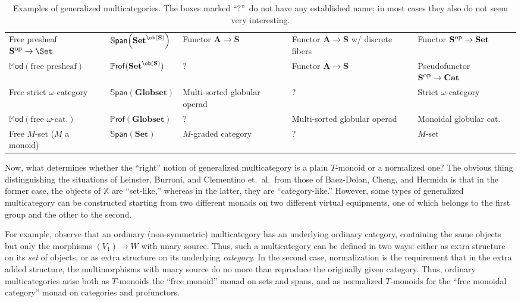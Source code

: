 \documentclass{tac}
\makeatletter
\newcommand{\mb}[1]{{\mathbf{#1}}}
\newcommand{\SPAN}[1]{\mathbb{S}\mathsf{pan}\!\left(\mb{#1}\right)}
\newcommand{\iPROF}[1]{\mathbb{P}\mathsf{rof}(\mb{#1})}
\newcommand{\MOD}{\mathbb{M}\mathsf{od}}
\newcommand{\op}{\mbox{\scriptsize op}}
\numberwithin{equation}{section}
\def\currthmtype{}
\let\old@label\label
\def\label#1{%
    {\let\your@currentlabel\@currentlabel%
      \edef\@currentlabel{\currthmtype}%
      \old@label{label@name@#1}}%
    \old@label{#1}}
\makeatother
\begin{document}
\begin{table}
\begin{tabular}{p{3cm}p{2.5cm}p{3cm}p{3cm}p{3cm}}
\rowcolor[gray]{0.8}\raggedright Free presheaf $\mb{S}^{\op}\to \Set$ & $\SPAN{\mb{Set}^{\ob(\mb{S})}}$ & Functor $\mb{A}\to\mb{S}$ & Functor $\mb{A} \to \mb{S}$ w/ discrete fibers & Functor $\mb{S}^{\op} \to \mb{Set}$ \\
$\MOD(\text{free presheaf})$ & $\iPROF{\mb{Set}^{\ob(S)}}$ & ? & Functor $\mb{A} \to \mb{S}$ & Pseudofunctor $\mb{S}^{\op} \to \mb{Cat}$ \\
\rowcolor[gray]{0.8}\raggedright Free strict \mbox{$\omega$-category} & $\SPAN{Globset}$ & Multi-sorted globular operad & ? & Strict $\omega$-category\\
$\MOD(\text{free $\omega$-cat.})$ & $\iPROF{Globset}$ & ? & Multi-sorted globular operad & Monoidal \mbox{globular} cat.\\
\rowcolor[gray]{0.8}Free $M$-set ($M$ a monoid) & $\SPAN{Set}$ & $M$-graded \mbox{category} & ? & $M$-set\\
\end{tabular}
\caption{Examples of generalized multicategories.
  The boxes marked ``?''\ do not have any established name; in most
  cases they also do not seem very interesting.}
\label{tab:egs}
\end{table}


Now, what determines whether the ``right'' notion of generalized
multicategory is a plain $T$-monoid or a normalized one?  The obvious
thing distinguishing the situations of Leinster, Burroni, and Clementino
et.\ al.\ from those of Baez-Dolan, Cheng, and Hermida is that in the
former case, the objects of $\mathbb{X}$ are ``set-like,'' whereas in
the latter, they are ``category-like.''  However, some types of
generalized multicategory can be constructed starting from two different
monads on two different virtual equipments, one of which belongs to the
first group and the other to the second.

For example, observe that an ordinary (non-symmetric) multicategory has
an underlying ordinary category, containing the same objects but only
the morphisms $(V_1) \to W$ with unary source.  Thus, such a
multicategory can be defined in two ways: either as extra structure on
its \emph{set} of objects, or as extra structure on its underlying
\emph{category}.  In the second case, normalization is the requirement
that in the extra added structure, the multimorphisms with unary source
do no more than reproduce the originally given category.  Thus, ordinary
multicategories arise both as $T$-monoids the ``free monoid'' monad on
sets and spans, and as normalized $T$-monoids for the ``free monoidal
category'' monad on categories and profunctors.
\end{document}
